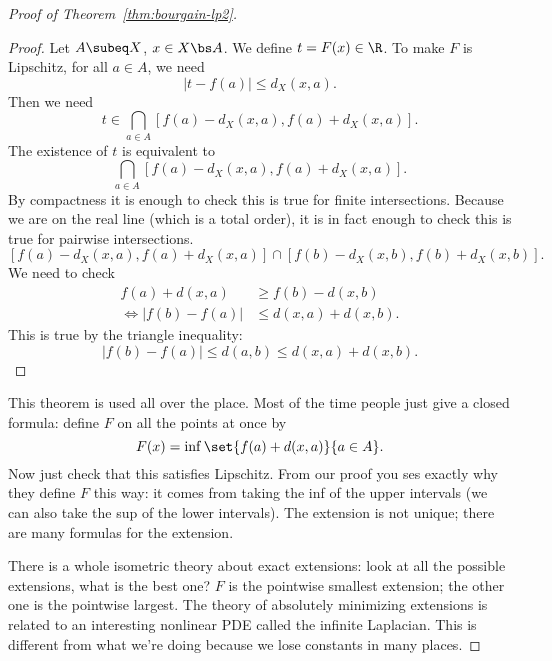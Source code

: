 \begin{proof}[Proof of Theorem~\ref{thm:bourgain-lp2}]
\begin{proof}
Let $A\subeq X$, $x\in X\bs A$. We define $t=F(x)\in \R$. To make $F$ is Lipschitz, for all $a\in A$, we need
\[
|t-f(a)|\le d_X(x,a).
\]
Then we need
\[t\in \bigcap_{a\in A} [f(a)-d_X(x,a),f(a)+d_X(x,a)].\]
The existence of $t$ is equivalent to 
\[
\bigcap_{a\in A}[f(a)-d_X(x,a),f(a)+d_X(x,a)].
\]
By compactness it is enough to check this is true for finite intersections. Because we are on the real line (which is a total order), it is in  fact enough to check this is true for pairwise intersections. 
\[
[f(a)-d_X(x,a), f(a)+d_X(x,a)] \cap [f(b)-d_X(x,b), f(b)+d_X(x,b)].
\]
We need to check 
\begin{align*}
f(a)+d(x,a) &\ge f(b) -d(x,b)\\
\iff 
|f(b)-f(a)|&\le d(x,a)+d(x,b).
\end{align*}
This is true by the triangle inequality: 
\[
|f(b)-f(a)|\le d(a,b) \le  d(x,a)+d(x,b).
\]
\end{proof}
This theorem is used all over the place. Most of the time people just give a closed formula: define $F$ on all the points at once by
\[
F(x)=\inf\set{f(a)+d(x,a)}{a\in A}.
\]
Now just check that this satisfies Lipschitz. From our proof you ses exactly why they define $F$ this way: it comes from taking the inf of the upper intervals (we can also take the sup of the lower intervals). The extension is not unique; there are many formulas for the extension.

There is a whole isometric theory about exact extensions: look at all the possible extensions, what is the best one? $F$ is the pointwise smallest extension; the other one is the pointwise largest. The theory of absolutely minimizing extensions is related to an interesting nonlinear PDE called the infinite Laplacian. This is different from what we're doing because we lose constants in many places.


\end{proof}
